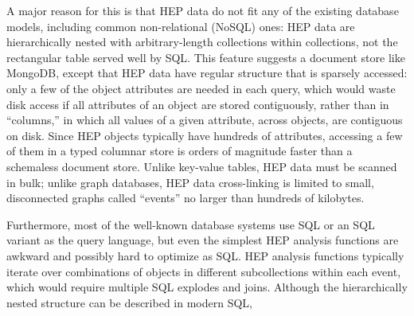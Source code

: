\documentclass[10pt, conference, compsocconf]{IEEEtran}
\begin{document}
A major reason for this is that HEP data do not fit any of the existing database models, including common non-relational (NoSQL) ones: HEP data are hierarchically nested with arbitrary-length collections within collections, not the rectangular table served well by SQL. This feature suggests a document store like MongoDB\cite{mongodb}, except that HEP data have regular structure that is sparsely accessed: only a few of the object attributes are needed in each query, which would waste disk access if all attributes of an object are stored contiguously, rather than in ``columns,'' in which all values of a given attribute, across objects, are contiguous on disk. Since HEP objects typically have hundreds of attributes, accessing a few of them in a typed columnar store is orders of magnitude faster than a schemaless document store. Unlike key-value tables, HEP data must be scanned in bulk; unlike graph databases, HEP data cross-linking is limited to small, disconnected graphs called ``events'' no larger than hundreds of kilobytes.

Furthermore, most of the well-known database systems use SQL or an SQL variant as the query language, but even the simplest HEP analysis functions are awkward and possibly hard to optimize as SQL. HEP analysis functions typically iterate over combinations of objects in different subcollections within each event, which would require multiple SQL explodes and joins. Although the hierarchically nested structure can be described in modern SQL,

\vspace{0.15 cm}


\end{document}
